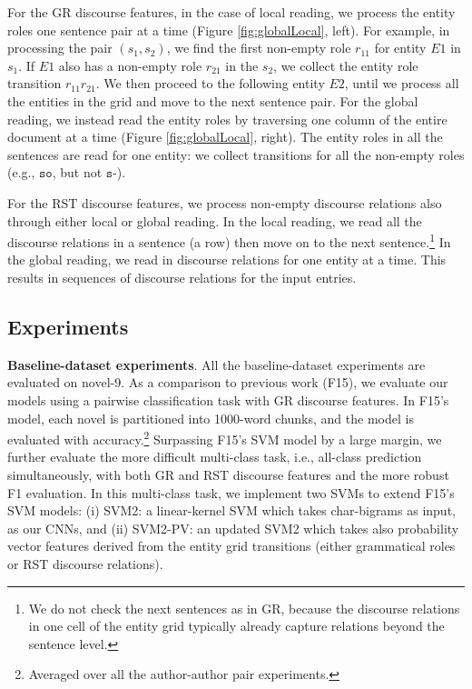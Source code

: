 For the GR discourse features, in the case of local reading, we process the entity roles one sentence pair at a time (Figure \ref{fig:globalLocal}, left).
For example, in processing the pair $(s_1,s_2)$, 
we find the first non-empty role $r_{11}$ for entity $E1$ in $s_1$. If $E1$ also has a non-empty role $r_{21}$ in the $s_2$, we collect the entity role transition $r_{11}r_{21}$. We then proceed to the following entity $E2$, until we process all the entities in the grid and move to the next sentence pair. 
For the global reading, we instead read the entity roles by traversing one column of the entire document at a time (Figure \ref{fig:globalLocal}, right). The entity roles in all the sentences are read for one entity: 
we collect transitions for all the non-empty roles (e.g., $\texttt{so}$, but not $\texttt{s-}$).

For the RST discourse features, we process non-empty discourse relations also through either local or global reading.
In the local reading, we read all the discourse relations in a sentence (a row) then move on to the next sentence.\footnote{We do not check the next sentences as in GR, because the discourse relations in one cell of the entity grid typically already capture relations beyond the sentence level.}
In the global reading, we read in discourse relations for one entity at a time. 
This results in sequences of discourse relations for the input entries. 

\subsection{Experiments}
\label{subsec:experiments}

\textbf{Baseline-dataset experiments}.
All the baseline-dataset experiments are evaluated on novel-9. As a comparison to previous work (F15), we evaluate our models using a pairwise classification task with GR discourse features. In F15's model, each novel is partitioned into 1000-word chunks, and the model is evaluated with accuracy.\footnote{Averaged over all the author-author pair experiments.}
Surpassing F15's SVM model by a large margin, we  further evaluate the more difficult multi-class task, i.e., all-class prediction simultaneously, with both GR and RST discourse features and the more robust F1 evaluation.
In this multi-class task, we implement two SVMs to extend F15's SVM models:
(i) SVM2: a linear-kernel SVM which takes char-bigrams as input, as our CNNs, and (ii) SVM2-PV: an updated SVM2 which takes also probability vector features derived from the entity grid transitions (either grammatical roles or RST discourse relations).

